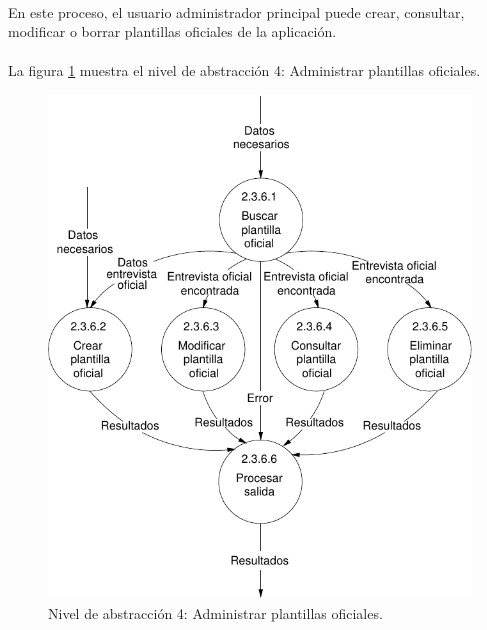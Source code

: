 \paragraph{}En este proceso, el usuario administrador principal puede crear,
consultar, modificar o borrar plantillas oficiales de la aplicación.

\paragraph{}La figura \ref{diagramaNivel4-AdministrarPlantillasOficiales}
muestra el nivel de abstracción 4: Administrar plantillas oficiales.

  \begin{figure}[!ht]
    \begin{center}
      \includegraphics[]{08.Analisis_Funcional/8.2.DFDs/Niveles/Nivel4/AdministradorPrincipal/AdministrarPlantillasOficiales/Diagramas/nivel4-AdministrarPlantillasOficiales.pdf}
      \caption{Nivel de abstracción 4: Administrar plantillas oficiales.}
      \label{diagramaNivel4-AdministrarPlantillasOficiales}
    \end{center}
  \end{figure}
